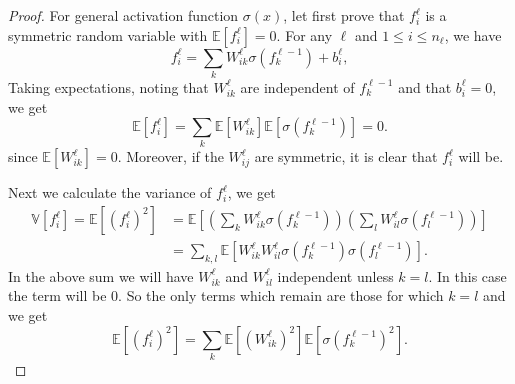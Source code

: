 \begin{proof}
For general activation function $\sigma(x)$, let first prove that
$f^\ell_i$  is a symmetric random variable with $\mathbb{E}[f^\ell_i] = 0$.
For any $\ell$ and $1\le i \le n_\ell$, we have
\begin{equation}
 f^\ell_i = \sum_k W^\ell_{ik}\sigma(f^{\ell-1}_k) + b_i^\ell,
\end{equation}
Taking expectations, noting that $W^\ell_{ik}$ are independent of $f^{\ell-1}_k$ and that $b_i^\ell = 0$, we get
\begin{equation}
 \mathbb{E}[f^\ell_i] = \sum_k \mathbb{E}[W^\ell_{ik}]\mathbb{E}[\sigma(f^{\ell-1}_k)] = 0.
\end{equation}
since $\mathbb{E}[W^\ell_{ik}] = 0$.
Moreover, if the $W_{ij}^\ell$ are symmetric, it is clear that $f^\ell_i$ will be.

 
%
Next we calculate the variance of $f^{\ell}_i$, we get
\begin{equation}
\begin{split}
 \mathbb{V}[f^{\ell}_i] = \mathbb{E}[(f^{\ell}_i)^2] &= \mathbb{E}\left[\left(\sum_k W^\ell_{ik}\sigma(f^{\ell-1}_k)\right)\left(\sum_l W^\ell_{il}\sigma(f^{\ell-1}_l)\right)\right]\\ &= \sum_{k,l}\mathbb{E}[W^\ell_{ik}W^\ell_{il}\sigma(f^{\ell-1}_k)\sigma(f^{\ell-1}_l)].
 \end{split}
\end{equation}
In the above sum we will have $W^\ell_{ik}$ and $W^\ell_{il}$ independent unless $k = l$. In this case the term will be $0$. So the only terms which remain are those for which $k=l$ and we get
\begin{equation}\label{eq:FWini}
  \mathbb{E}[(f^{\ell}_i)^2] = \sum_{k}\mathbb{E}[(W^\ell_{ik})^2]\mathbb{E}[\sigma(f^{\ell-1}_k)^2].
\end{equation}

\end{proof}


